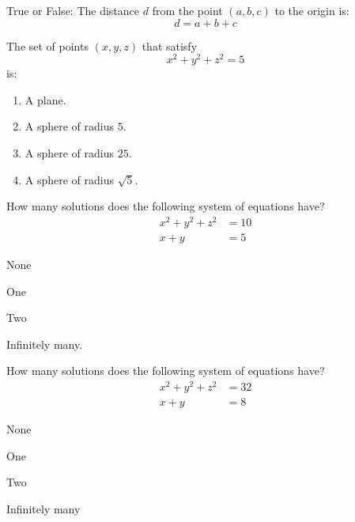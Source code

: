 \documentclass[nooutcomes,noauthor]{ximera}
\author{Claire Merriman \and Bart Snapp}
\begin{document}
\maketitle


\begin{exercise}
  True or False: The distance $d$ from the point $(a,b,c)$ to the
  origin is:
  \[
  d = a+b+c
  \]
\end{exercise}



\begin{exercise}
  The set of points $(x,y,z)$ that satisfy
  \[
  x^2 + y^2+z^2 = 5
  \]
  is:
  \begin{enumerate}
  \item A plane.
  \item A sphere of radius $5$.
  \item A sphere of radius $25$.
  \item A sphere of radius $\sqrt{5}$.
  \end{enumerate}
\end{exercise}

\begin{exercise}
  How many solutions does the following system of equations have?
  \begin{align*}
    x^2 + y^2 + z^2 &= 10\\
    x+y &=5
  \end{align*}
   \begin{enumerate}
\begin{multicols}{2}
 \item None
 \item One
 \item Two
 \item Infinitely many.
\end{multicols}
\end{enumerate}
\end{exercise}





\begin{exercise}
  How many solutions does the following system of equations have?
  \begin{align*}
    x^2 + y^2 + z^2 &= 32\\
    x+y &=8
  \end{align*}
   \begin{enumerate}
\begin{multicols}{2}
 \item None
 \item One
 \item Two
 \item Infinitely many
\end{multicols}
\end{enumerate}
\end{exercise}
\end{document}
